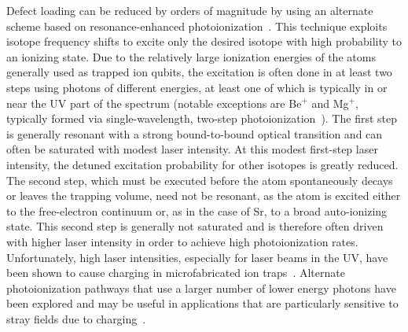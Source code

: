 \documentclass[%
reprint,
 amsmath,amssymb,
]{revtex4-1}
\begin{document}
Defect loading can be reduced by orders of magnitude by using an alternate scheme based on resonance-enhanced photoionization~\cite{kjaergaard2000isotope,GuldePhotoIonize2001}. This technique exploits isotope frequency shifts to excite only the desired isotope with high probability to an ionizing state. Due to the relatively large ionization energies of the atoms generally used as trapped ion qubits, the excitation is often done in at least two steps using photons of different energies, at least one of which is typically in or near the UV part of the spectrum (notable exceptions are Be$^{+}$ and Mg$^{+}$, typically formed via single-wavelength, two-step photoionization~\cite{Wolf2018,kjaergaard2000isotope}). The first step is generally resonant with a strong bound-to-bound optical transition and can often be saturated with modest laser intensity. At this modest first-step laser intensity, the detuned excitation probability for other isotopes is greatly reduced. The second step, which must be executed before the atom spontaneously decays or leaves the trapping volume, need not be resonant, as the atom is excited either to the free-electron continuum or, as in the case of Sr, to a broad auto-ionizing state. This second step is generally not saturated and is therefore often driven with higher laser intensity in order to achieve high photoionization rates. Unfortunately, high laser intensities, especially for laser beams in the UV, have been shown to cause charging in microfabricated ion traps~\cite{harlander2010trapped,wang2011laser}.  Alternate photoionization pathways that use a larger number of lower energy photons have been explored and may be useful in applications that are particularly sensitive to stray fields due to charging~\cite{zhang2017realizing}.
\end{document}
